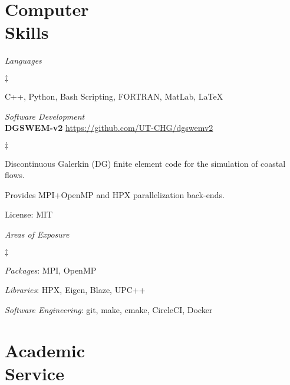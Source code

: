 \documentclass[margin,line]{res}
\newenvironment{list2}{
  \begin{list}{$\ddagger$}{%
      \setlength{\itemsep}{0in}
      \setlength{\parsep}{0in} \setlength{\parskip}{0in}
      \setlength{\topsep}{0in} \setlength{\partopsep}{0in}
      \setlength{\leftmargin}{0.2in}}}{\end{list}}
\begin{document}
\begin{resume}



\section{\sc Computer \\ Skills}

\textit{Languages}
\vspace{0.05in}
\begin{list2}
\item C++, Python, Bash Scripting, FORTRAN, MatLab, \LaTeX
\end{list2}

\textit{Software Development}\\
\vspace{0.05in}
{\bf DGSWEM-v2} \hfill \url{https://github.com/UT-CHG/dgswemv2}
\begin{list2}
\item Discontinuous Galerkin (DG) finite element code for the simulation of coastal flows.
\item Provides MPI+OpenMP and HPX parallelization back-ends.
\item License: MIT
\end{list2}

\textit{Areas of Exposure}
\vspace{0.05in}
\begin{list2}
\item {\em Packages}: MPI, OpenMP
\item {\em Libraries}: HPX, Eigen, Blaze, UPC++
\item {\em Software Engineering}: git, make, cmake, CircleCI, Docker
\end{list2}

\section{\sc Academic \\ Service}


\end{resume}
\end{document}
